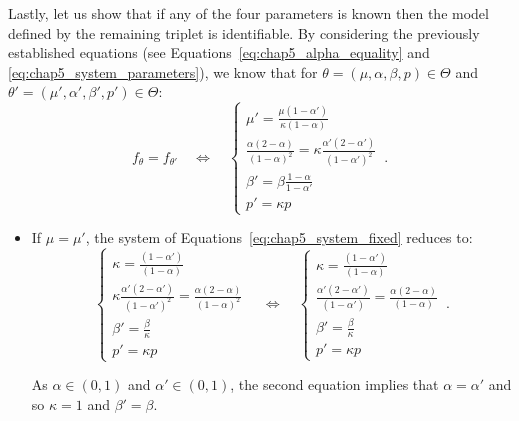 \begin{subappendices}
    Lastly, let us show that if any of the four parameters is known then the model defined by the remaining triplet is identifiable.
    By considering the previously established equations (see Equations~\eqref{eq:chap5_alpha_equality} and \eqref{eq:chap5_system_parameters}), 
    we know that for $\theta = (\mu, \alpha, \beta, p)\in\Theta$ and $\theta' = (\mu', \alpha', \beta', p')\in\Theta$:
    \begin{equation}\label{eq:chap5_system_fixed}
        f_{\theta} = f_{\theta'} \quad\iff\quad 
        \begin{cases*}
            \mu' = \frac{\mu(1-\alpha')}{\kappa(1-\alpha)}\\
            \frac{\alpha (2-\alpha)}{(1-\alpha)^2} = \kappa \frac{\alpha' (2-\alpha')}{(1-\alpha')^2}\\     
            \beta' = \beta \frac{1-\alpha}{1-\alpha'}\\
            p' = \kappa p
        \end{cases*}\,.
    \end{equation}
    \begin{itemize}
        \item If $\mu = \mu'$, the system of Equations~\eqref{eq:chap5_system_fixed} reduces to:
        \begin{equation*}
            \begin{cases*}
                \kappa = \frac{(1-\alpha')}{(1-\alpha)}\\
                \kappa \frac{\alpha' (2-\alpha')}{(1-\alpha')^2} = \frac{\alpha (2-\alpha)}{(1-\alpha)^2}\\     
                \beta' = \frac{\beta}{\kappa}\\
                p' = \kappa p
            \end{cases*}\quad\iff\quad
            \begin{cases*}
                \kappa = \frac{(1-\alpha')}{(1-\alpha)}\\
                \frac{\alpha' (2-\alpha')}{(1-\alpha')} = \frac{\alpha (2-\alpha)}{(1-\alpha)}\\     
                \beta' = \frac{\beta}{\kappa}\\
                p' = \kappa p
            \end{cases*}\,.
        \end{equation*}

        As $\alpha\in(0,1)$ and $\alpha'\in(0,1)$, the second equation implies that $\alpha=\alpha'$ and so $\kappa=1$ and $\beta'=\beta$.


\end{itemize}
\end{subappendices}
